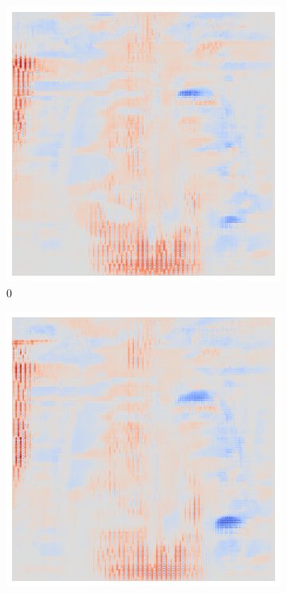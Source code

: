 \begin{figure}[ht!]
    \centering
    \begin{subfigure}{0.095\linewidth}
        \centering
        \includegraphics[height=1\linewidth]{01-images/05-resultate/uap_efficientnet/uap0-efficientnetv2m-covid-n200-robustificationslevel0.png}
        \caption{0}
    \end{subfigure}\hfill%
    \begin{subfigure}{0.095\linewidth}
        \centering
        \includegraphics[height=1\linewidth]{01-images/05-resultate/uap_efficientnet/uap0-efficientnetv2m-covid-n200-robustificationslevel1.png}

\end{subfigure}
\end{figure}
